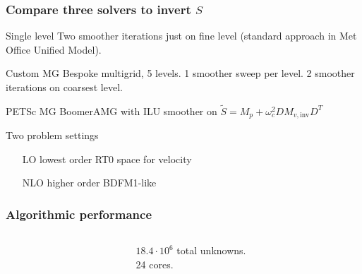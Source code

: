 \documentclass[presentation]{beamer}
\renewcommand{\vec}[1]{\ensuremath{\boldsymbol{#1}}}
\begin{document}
\begin{frame}
  \frametitle{Compare three solvers to invert $S$}
  \begin{block}{Single level}
    Two smoother iterations just on fine level (standard approach in
    Met Office Unified Model).
  \end{block}

  \begin{block}{Custom MG}
    Bespoke multigrid, 5 levels.  1 smoother sweep per level.  2 smoother
    iterations on coarsest level.
  \end{block}

  \begin{block}{PETSc MG}
    BoomerAMG with ILU smoother on $\tilde{S} = M_p + \omega_c^2 D M_{v,\text{inv}} D^T$
  \end{block}
  \begin{block}{Two problem settings}
    \begin{itemize}
    \item[LO] lowest order RT0 space for velocity
    \item[NLO] higher order BDFM1-like \parencite{Cotter:2012a}
    \end{itemize}
  \end{block}
\end{frame}
\begin{frame}
  \frametitle{Algorithmic performance}
  \begin{columns}
    \begin{column}{0.75\textwidth}
    \end{column}
    \begin{column}{0.25\textwidth}
      $18.4\cdot 10^6$ total unknowns.\\
      24 cores.
    \end{column}
  \end{columns}
\end{frame}
\end{document}
